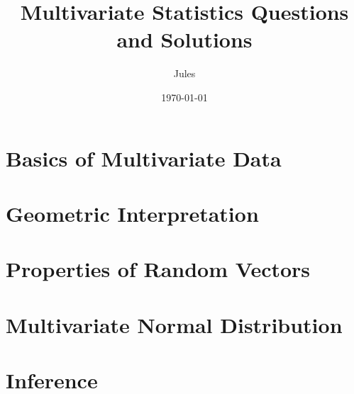 \documentclass{article}
\title{Multivariate Statistics Questions and Solutions}
\author{Jules}
\date{\today}
\begin{document}
\maketitle
\tableofcontents
\newpage

\section{Basics of Multivariate Data}

\newpage

\section{Geometric Interpretation}

\newpage

\section{Properties of Random Vectors}

\newpage

\section{Multivariate Normal Distribution}

\newpage

\section{Inference}

\end{document}
